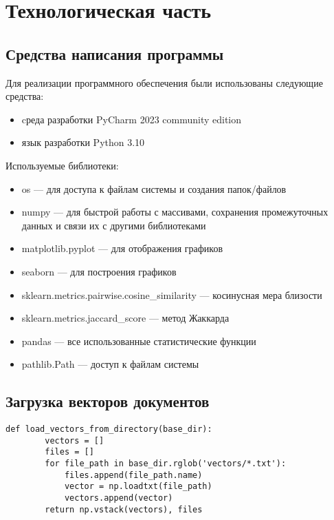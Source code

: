 \chapter{Технологическая часть}

\section{Средства написания программы}
Для реализации программного обеспечения были использованы следующие средства:

\begin{itemize}
    \item cреда разработки PyCharm 2023 community edition \cite{lib:pycharm}
    \item язык разработки Python 3.10 \cite{lib:python}
\end{itemize}
	
Используемые библиотеки:
\begin{itemize}
    \item os — для доступа к файлам системы и создания папок/файлов \cite{lib:os}
    \item numpy — для быстрой работы с массивами, сохранения промежуточных данных и связи их с другими библиотеками \cite{lib:numpy}
    \item matplotlib.pyplot — для отображения графиков \cite{lib:matplotlib}
    \item seaborn — для построения графиков \cite{lib:seaborn}
    \item sklearn.metrics.pairwise.cosine\_similarity — косинусная мера близости \cite{lib:sklearn}
    \item sklearn.metrics.jaccard\_score — метод Жаккарда \cite{lib:sklearn}
    \item pandas — все использованные статистические функции \cite{lib:pandas}
    \item pathlib.Path — доступ к файлам системы \cite{lib:pathlib}
\end{itemize}

\section{Загрузка векторов документов}

\begin{lstlisting}[label=load_vecs, caption={Загрузка векторов документов}]
    def load_vectors_from_directory(base_dir):
        vectors = []
        files = []
        for file_path in base_dir.rglob('vectors/*.txt'):
            files.append(file_path.name)
            vector = np.loadtxt(file_path)
            vectors.append(vector)
        return np.vstack(vectors), files
\end{lstlisting}

